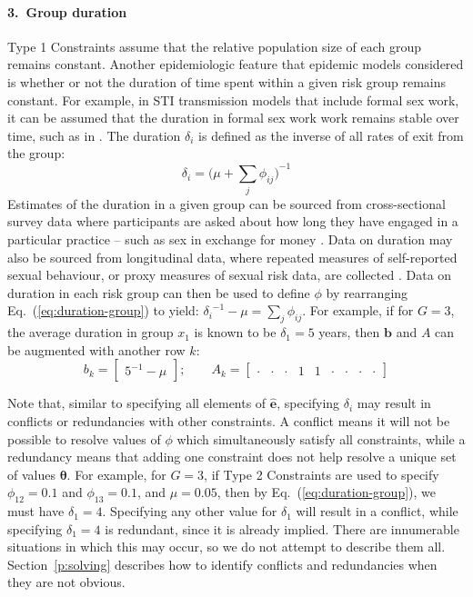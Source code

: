 \paragraph{3.~Group duration}
\label{con:group-dur}
Type 1 Constraints assume that the relative population size of each group remains constant.
Another epidemiologic feature that epidemic models considered
is whether or not the duration of time spent within a given risk group remains constant.
For example, in STI transmission models that include formal sex work,
it can be assumed that the duration in formal sex work work remains stable over time,
such as in \citep{Mishra2014a,Boily2015}.
The duration $\delta_i$ is defined as the inverse of all rates of exit from the group:
\begin{equation}\label{eq:duration-group}
\delta_i = {\bigg(\mu + \sum_{j}{\phi_{ij}}\bigg)}^{-1}
\end{equation}
Estimates of the duration in a given group can be sourced from
cross-sectional survey data where participants are asked about
how long they have engaged in a particular practice
-- such as sex in exchange for money \citep{Watts2010}.
Data on duration may also be sourced from longitudinal data,
where repeated measures of self-reported sexual behaviour,
or proxy measures of sexual risk data,
are collected \citep{DHS,PHIAproject}.
Data on duration in each risk group can then be used to define $\phi$ by
rearranging Eq.~(\ref{eq:duration-group}) to yield:
${\delta_{i}}^{-1} - \mu = \sum_{j}{\phi_{ij}}$.
For example, if for $G = 3$,
the average duration in group $x_1$ is known to be $\delta_1 = 5$ years,
then $\bm{b}$ and $A$ can be augmented with another row $k$:
\begin{equation}\label{eq:eg-dur}
b_k = \left[\begin{array}{c}
{5}^{-1} - \mu
\end{array}\right];\qquad
A_k = \left[\begin{array}{ccccccccc}
	\cdot & \cdot & \cdot & 1 & 1 & \cdot & \cdot & \cdot & \cdot
\end{array}\right]
\end{equation}
\par
Note that, similar to specifying all elements of $\bm{\hat{e}}$,
specifying $\delta_i$ may result in conflicts or redundancies with other constraints.
A conflict means it will not be possible to resolve values of $\phi$
which simultaneously satisfy all constraints, while
a redundancy means that adding one constraint does not help resolve
a unique set of values $\bm{\theta}$.
For example, for $G = 3$,
if Type 2 Constraints are used to specify $\phi_{12} = 0.1$ and $\phi_{13} = 0.1$,
and $\mu = 0.05$, then by Eq.~(\ref{eq:duration-group}), we must have
$\delta_1 = 4$.
Specifying any other value for $\delta_1$ will result in a conflict,
while specifying $\delta_1 = 4$ is redundant,
since it is already implied.
There are innumerable situations in which this may occur,
so we do not attempt to describe them all.
Section~\ref{p:solving} describes how to identify
conflicts and redundancies when they are not obvious.
